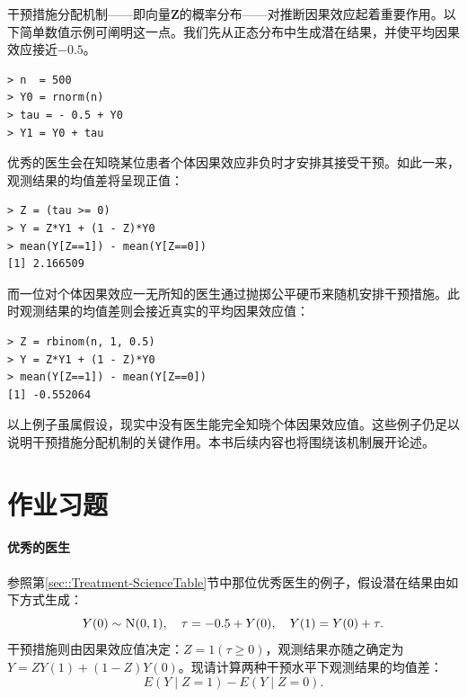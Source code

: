 干预措施分配机制——即向量$\bm{Z} $的概率分布——对推断因果效应起着重要作用。以下简单数值示例可阐明这一点。我们先从正态分布中生成潜在结果，并使平均因果效应接近$-0.5$。 
\begin{lstlisting}
> n  = 500
> Y0 = rnorm(n)
> tau = - 0.5 + Y0
> Y1 = Y0 + tau
\end{lstlisting} 
优秀的医生会在知晓某位患者个体因果效应非负时才安排其接受干预。如此一来，观测结果的均值差将呈现正值： 
\begin{lstlisting}
> Z = (tau >= 0)
> Y = Z*Y1 + (1 - Z)*Y0
> mean(Y[Z==1]) - mean(Y[Z==0])
[1] 2.166509
\end{lstlisting} 
而一位对个体因果效应一无所知的医生通过抛掷公平硬币来随机安排干预措施。此时观测结果的均值差则会接近真实的平均因果效应值：
\begin{lstlisting}
> Z = rbinom(n, 1, 0.5)
> Y = Z*Y1 + (1 - Z)*Y0
> mean(Y[Z==1]) - mean(Y[Z==0])
[1] -0.552064 
  \end{lstlisting} 
  
 以上例子虽属假设，现实中没有医生能完全知晓个体因果效应值。这些例子仍足以说明干预措施分配机制的关键作用。本书后续内容也将围绕该机制展开论述。 




 
\section{作业习题}



\paragraph{优秀的医生}
\label{hw::perfect-doctor}

参照第\ref{sec::Treatment-ScienceTable}节中那位优秀医生的例子，假设潜在结果由如下方式生成：
$$
Y(0) \sim \textsc{N}(0,1), \quad \tau = -0.5 + Y(0),\quad Y(1)  = Y(0) + \tau .
$$
干预措施则由因果效应值决定：$Z = 1(\tau \geq 0)$，观测结果亦随之确定为$Y = ZY(1) + (1-Z) Y(0)$。现请计算两种干预水平下观测结果的均值差：
$$
E(Y\mid Z=1) - E(Y\mid Z=0).
$$


